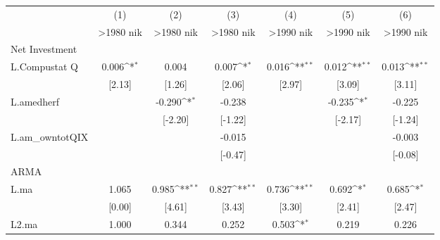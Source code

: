 {
\def\sym#1{\ifmmode^{#1}\else\(^{#1}\)\fi}
\begin{tabular}{l*{6}{c}}
\hline\hline
                    &\multicolumn{1}{c}{(1)}&\multicolumn{1}{c}{(2)}&\multicolumn{1}{c}{(3)}&\multicolumn{1}{c}{(4)}&\multicolumn{1}{c}{(5)}&\multicolumn{1}{c}{(6)}\\
                    &\multicolumn{1}{c}{>1980 nik}&\multicolumn{1}{c}{>1980 nik}&\multicolumn{1}{c}{>1980 nik}&\multicolumn{1}{c}{>1990 nik}&\multicolumn{1}{c}{>1990 nik}&\multicolumn{1}{c}{>1990 nik}\\
\hline
Net Investment      &                    &                    &                    &                    &                    &                    \\
L.Compustat Q       &       0.006\sym{*} &       0.004        &       0.007\sym{*} &       0.016\sym{**}&       0.012\sym{**}&       0.013\sym{**}\\
                    &      [2.13]        &      [1.26]        &      [2.06]        &      [2.97]        &      [3.09]        &      [3.11]        \\
L.amedherf          &                    &      -0.290\sym{*} &      -0.238        &                    &      -0.235\sym{*} &      -0.225        \\
                    &                    &     [-2.20]        &     [-1.22]        &                    &     [-2.17]        &     [-1.24]        \\
L.am\_owntotQIX      &                    &                    &      -0.015        &                    &                    &      -0.003        \\
                    &                    &                    &     [-0.47]        &                    &                    &     [-0.08]        \\
\hline
ARMA                &                    &                    &                    &                    &                    &                    \\
L.ma                &       1.065        &       0.985\sym{**}&       0.827\sym{**}&       0.736\sym{**}&       0.692\sym{*} &       0.685\sym{*} \\
                    &      [0.00]        &      [4.61]        &      [3.43]        &      [3.30]        &      [2.41]        &      [2.47]        \\
L2.ma               &       1.000        &       0.344        &       0.252        &       0.503\sym{*} &       0.219        &       0.226        \\

\end{tabular}}
